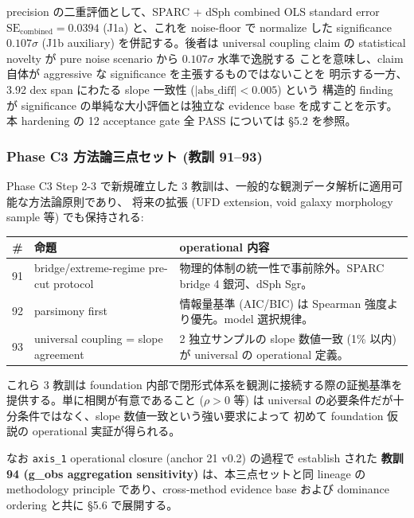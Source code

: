 \documentclass[11pt,a4paper]{ltjsarticle}
\begin{document}
precision の二重評価として、SPARC + dSph combined OLS standard error
$\mathrm{SE}_{\text{combined}} = 0.0394$ (J1a) と、これを noise-floor で normalize した
significance $0.107\sigma$ (J1b auxiliary) を併記する。後者は universal coupling
claim の statistical novelty が pure noise scenario から $0.107\sigma$ 水準で逸脱する
ことを意味し、claim 自体が aggressive な significance を主張するものではないことを
明示する一方、3.92 dex span にわたる slope 一致性 ($|\text{abs\_diff}| < 0.005$) という
構造的 finding が significance の単純な大小評価とは独立な evidence base を成すことを示す。
本 hardening の 12 acceptance gate 全 PASS については \S 5.2 を参照。


\subsubsection{Phase C3 方法論三点セット (教訓 91--93)}
Phase C3 Step 2-3 で新規確立した 3 教訓は、一般的な観測データ解析に適用可能な方法論原則であり、
将来の拡張 (UFD extension, void galaxy morphology sample 等) でも保持される:

\begin{center}\small
\begin{tabular}{@{}cp{40mm}p{70mm}@{}}
\toprule
\# & 命題 & operational 内容 \\
\midrule
91 & bridge/extreme-regime pre-cut protocol & 物理的体制の統一性で事前除外。SPARC bridge 4 銀河、dSph Sgr。 \\
92 & parsimony first & 情報量基準 (AIC/BIC) は Spearman 強度より優先。model 選択規律。 \\
93 & universal coupling = slope agreement & 2 独立サンプルの slope 数値一致 (1\% 以内) が universal の operational 定義。 \\
\bottomrule
\end{tabular}
\end{center}

これら 3 教訓は foundation 内部で閉形式体系を観測に接続する際の証拠基準を提供する。単に相関が有意であること
($\rho > 0$ 等) は universal の必要条件だが十分条件ではなく、slope 数値一致という強い要求によって
初めて foundation 仮説の operational 実証が得られる。


\smallskip
\noindent
なお \texttt{axis\_1} operational closure (anchor 21 v0.2) の過程で establish された
\textbf{教訓 94 (g\_obs aggregation sensitivity)} は、本三点セットと同 lineage の
methodology principle であり、cross-method evidence base および dominance ordering
と共に \S 5.6 で展開する。
\end{document}
